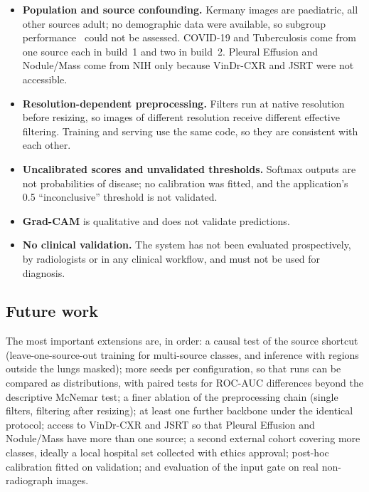 \begin{itemize}
\item \textbf{Population and source confounding.} Kermany images are paediatric, all other sources adult; no demographic data were available, so subgroup performance~\cite{seyyedkalantari2021underdiagnosis} could not be assessed. COVID-19 and Tuberculosis come from one source each in build~1 and two in build~2. Pleural Effusion and Nodule/Mass come from NIH only because VinDr-CXR and JSRT were not accessible.
\item \textbf{Resolution-dependent preprocessing.} Filters run at native resolution before resizing, so images of different resolution receive different effective filtering. Training and serving use the same code, so they are consistent with each other.
\item \textbf{Uncalibrated scores and unvalidated thresholds.} Softmax outputs are not probabilities of disease; no calibration was fitted, and the application's 0.5 ``inconclusive'' threshold is not validated.
\item \textbf{Grad-CAM} is qualitative and does not validate predictions.
\item \textbf{No clinical validation.} The system has not been evaluated prospectively, by radiologists or in any clinical workflow, and must not be used for diagnosis.
\end{itemize}

\subsection{Future work}
The most important extensions are, in order: a causal test of the source shortcut (leave-one-source-out training for multi-source classes, and inference with regions outside the lungs masked); more seeds per configuration, so that runs can be compared as distributions, with paired tests for ROC-AUC differences beyond the descriptive McNemar test; a finer ablation of the preprocessing chain (single filters, filtering after resizing); at least one further backbone under the identical protocol; access to VinDr-CXR and JSRT so that Pleural Effusion and Nodule/Mass have more than one source; a second external cohort covering more classes, ideally a local hospital set collected with ethics approval; post-hoc calibration fitted on validation; and evaluation of the input gate on real non-radiograph images.
